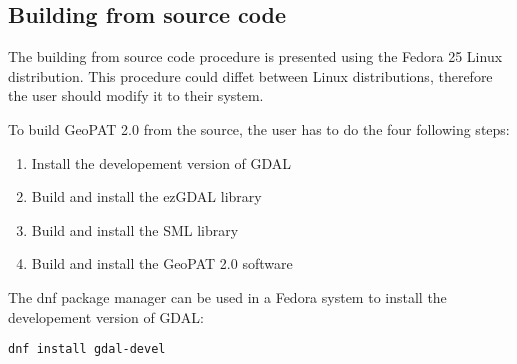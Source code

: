 % 
% 
% 
% 

\subsection{Building from source code}

The building from source code procedure is presented using the Fedora 25 Linux distribution.
This procedure could diffet between Linux distributions, therefore the user should modify it to their system.

To build GeoPAT 2.0 from the source, the user has to do the four following steps:

\begin{enumerate}
    \item{Install the developement version of GDAL}
    \item{Build and install the ezGDAL library}
    \item{Build and install the SML library}
    \item{Build and install the GeoPAT 2.0 software}
\end{enumerate}

The dnf package manager can be used in a Fedora system to install the developement version of GDAL:

\begin{lstlisting}
dnf install gdal-devel
\end{lstlisting}

